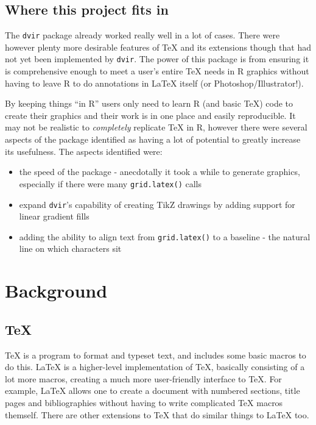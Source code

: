 \documentclass[]{article}
\providecommand{\tightlist}{%
  \setlength{\itemsep}{0pt}\setlength{\parskip}{0pt}}
\begin{document}
\subsection{Where this project fits
in}\label{where-this-project-fits-in}

The \texttt{dvir} package already worked really well in a lot of cases.
There were however plenty more desirable features of \TeX{} and its
extensions though that had not yet been implemented by \texttt{dvir}.
The power of this package is from ensuring it is comprehensive enough to
meet a user's entire \TeX{} needs in R graphics without having to leave
R to do annotations in \LaTeX{} itself (or Photoshop/Illustrator!).

By keeping things ``in R'' users only need to learn R (and basic \TeX)
code to create their graphics and their work is in one place and easily
reproducible. It may not be realistic to \emph{completely} replicate
\TeX{} in R, however there were several aspects of the package
identified as having a lot of potential to greatly increase its
usefulness. The aspects identified were:

\begin{itemize}
\tightlist
\item
  the speed of the package - anecdotally it took a while to generate
  graphics, especially if there were many \texttt{grid.latex()} calls
\item
  expand \texttt{dvir}'s capability of creating TikZ drawings by adding
  support for linear gradient fills
\item
  adding the ability to align text from \texttt{grid.latex()} to a
  baseline - the natural line on which characters sit
\end{itemize}

\newpage{}

\section{Background}\label{background}

\subsection{\texorpdfstring{\TeX{}}{}}\label{section}

\TeX{} is a program to format and typeset text, and includes some basic
macros to do this. \LaTeX{} is a higher-level implementation of \TeX{},
basically consisting of a lot more macros, creating a much more
user-friendly interface to \TeX{}. For example, \LaTeX{} allows one to
create a document with numbered sections, title pages and bibliographies
without having to write complicated \TeX{} macros themself. There are
other extensions to \TeX{} that do similar things to \LaTeX{} too.
\end{document}
